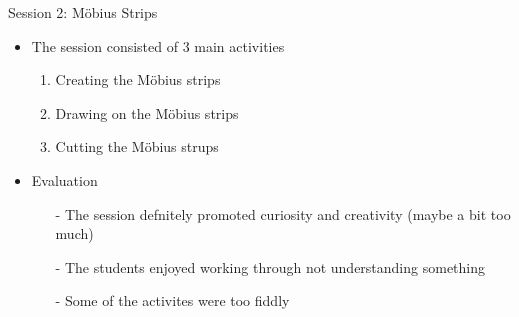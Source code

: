 \documentclass{beamer}  %
\begin{document}
\begin{frame}{Session 2: M\"{o}bius Strips}
    \begin{itemize}
        \item The session consisted of 3 main activities
        \begin{enumerate}
            \item Creating the M\"{o}bius strips
            \item Drawing on the M\"{o}bius strips
            \item Cutting the  M\"{o}bius strups
        \end{enumerate}

        \vspace{10pt}

        \item Evaluation
        \begin{itemize}
            \item[-] The session defnitely promoted curiosity and creativity  (maybe a bit too much)
            \item[-] The students enjoyed working through not understanding something 
            \item[-] Some of the activites were too fiddly 
        \end{itemize}
    \end{itemize}
\end{frame}
\end{document}
